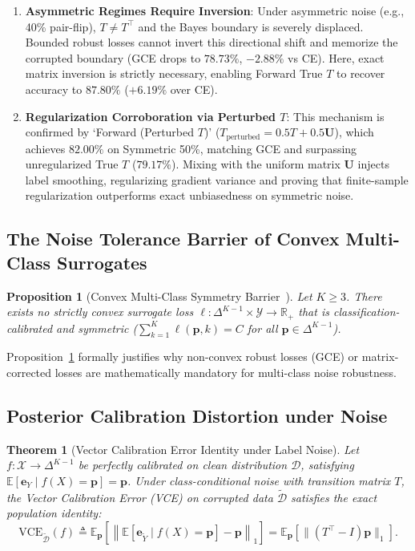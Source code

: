\documentclass[10pt,twocolumn]{article}
\newtheorem{theorem}{Theorem}
\newtheorem{proposition}{Proposition}
\theoremstyle{definition}
\begin{document}
\begin{enumerate}
    \item \textbf{Asymmetric Regimes Require Inversion}: Under asymmetric noise (e.g., 40\% pair-flip), $T \ne T^\top$ and the Bayes boundary is severely displaced. Bounded robust losses cannot invert this directional shift and memorize the corrupted boundary (GCE drops to $78.73\%$, $-2.88\%$ vs CE). Here, exact matrix inversion is strictly necessary, enabling Forward True $T$ to recover accuracy to $87.80\%$ ($+6.19\%$ over CE).
    \item \textbf{Regularization Corroboration via Perturbed $T$}: This mechanism is confirmed by `Forward (Perturbed $T$)' ($T_{\text{perturbed}} = 0.5 T + 0.5 \mathbf{U}$), which achieves $82.00\%$ on Symmetric 50\%, matching GCE and surpassing unregularized True $T$ ($79.17\%$). Mixing with the uniform matrix $\mathbf{U}$ injects label smoothing, regularizing gradient variance and proving that finite-sample regularization outperforms exact unbiasedness on symmetric noise.
\end{enumerate}

\subsection{The Noise Tolerance Barrier of Convex Multi-Class Surrogates}
\begin{proposition}[Convex Multi-Class Symmetry Barrier~\cite{charoenphakdee2019symmetric}]
\label{prop:convex_barrier}
Let $K \ge 3$. There exists no strictly convex surrogate loss $\ell: \Delta^{K-1} \times \mathcal{Y} \to \mathbb{R}_+$ that is classification-calibrated and symmetric ($\sum_{k=1}^K \ell(\mathbf{p}, k) = C$ for all $\mathbf{p} \in \Delta^{K-1}$).
\end{proposition}
Proposition~\ref{prop:convex_barrier} formally justifies why non-convex robust losses (GCE) or matrix-corrected losses are mathematically mandatory for multi-class noise robustness.

\subsection{Posterior Calibration Distortion under Noise}
\begin{theorem}[Vector Calibration Error Identity under Label Noise]
\label{thm:vce}
Let $f: \mathcal{X} \to \Delta^{K-1}$ be perfectly calibrated on clean distribution $\mathcal{D}$, satisfying $\mathbb{E}[\mathbf{e}_Y \mid f(X) = \mathbf{p}] = \mathbf{p}$. Under class-conditional noise with transition matrix $T$, the Vector Calibration Error (VCE) on corrupted data $\tilde{\mathcal{D}}$ satisfies the exact population identity:
\begin{equation}
\text{VCE}_{\tilde{\mathcal{D}}}(f) \triangleq \mathbb{E}_{\mathbf{p}} \left[ \left\| \mathbb{E}[\mathbf{e}_{\tilde{Y}} \mid f(X) = \mathbf{p}] - \mathbf{p} \right\|_1 \right] = \mathbb{E}_{\mathbf{p}} \left[ \| (T^\top - I) \mathbf{p} \|_1 \right].
\end{equation}
\end{theorem}
\end{document}
